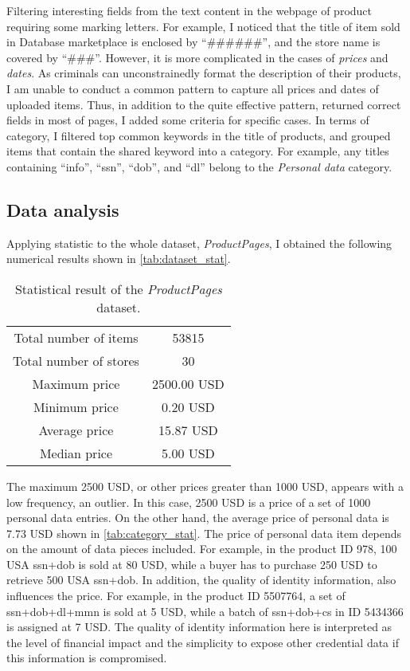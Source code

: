 Filtering interesting fields from the text content in the webpage of product requiring
some marking letters. For example, I noticed that the title of item sold in Database
marketplace is enclosed by ``\#\#\#\#\#\#'', and the store name is covered by ``\#\#\#''. However,
it is more complicated in the cases of \emph{prices} and \emph{dates}. As criminals can
unconstrainedly format the description of their products, I am unable to conduct a common
pattern to capture all prices and dates of uploaded items. Thus, in addition to the quite
effective pattern, returned correct fields in most of pages, I added some criteria for
specific cases. In terms of category, I filtered top common keywords in the title of
products, and grouped items that contain the shared keyword into a category. For example,
any titles containing ``info'', ``ssn'', ``dob'', and ``dl'' belong to the \emph{Personal
data} category.

\subsection{Data analysis}
%
Applying statistic to the whole dataset, \emph{ProductPages}, I obtained the following
numerical results shown in \autoref{tab:dataset_stat}.

\begin{table}
    \centering
    \begin{tabular}{|c|c|}
        \hline
        Total number of items & 53815\\
        Total number of stores & 30\\
        Maximum price & 2500.00 USD\\
        Minimum price & 0.20 USD\\
        Average price & 15.87 USD\\
        Median price & 5.00 USD\\
        \hline
    \end{tabular}
    \caption{Statistical result of the \emph{ProductPages} dataset.}
    \label{tab:dataset_stat}
\end{table}

The maximum 2500 USD, or other prices greater than 1000 USD, appears with a low
frequency, an outlier. In this case, 2500 USD is a price of a set of 1000 personal data
entries. On the other hand, the average price of personal data is 7.73 USD shown
in \autoref{tab:category_stat}. The price of personal data item depends on the amount
of data pieces included. For example, in the product ID 978, 100 USA \acrshort{ssn}+\acrshort{dob}
is sold at 80 USD, while a buyer has to purchase 250 USD to retrieve 500 USA \acrshort{ssn}+\acrshort{dob}.
In addition, the quality of identity information, also influences
the price. For example, in the product ID 5507764, a set of \acrshort{ssn}+\acrshort{dob}+\acrshort{dl}+\acrshort{mmn}
is sold at 5 USD, while a batch of \acrshort{ssn}+\acrshort{dob}+\acrshort{cs} in ID 5434366 is
assigned at 7 USD\@. The quality of identity information here is interpreted as the level
of financial impact and the simplicity to expose other credential data if this
information is compromised.

